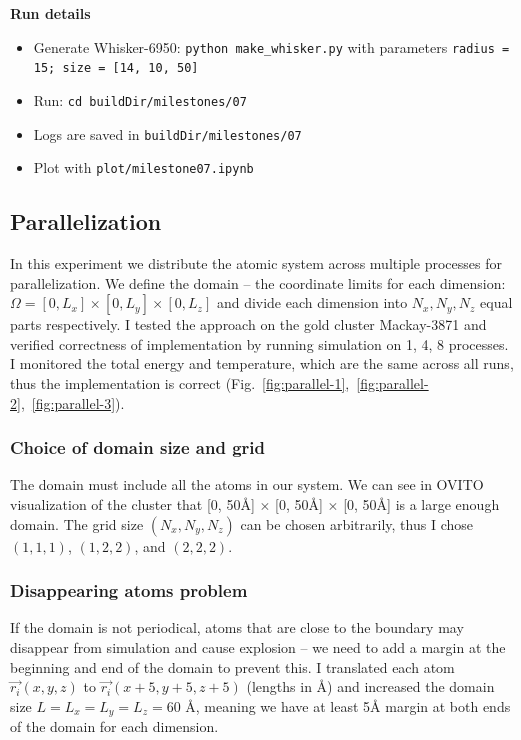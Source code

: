 \documentclass[12pt,a4paper]{article}
\newcommand{\mat}[1]{\vec{#1}}
\begin{document}
{\bf Run details}
\begin{itemize}
	\item Generate Whisker-6950: \verb|python make_whisker.py| with parameters \verb|radius = 15; size = [14, 10, 50]|
	\item Run: \verb|cd buildDir/milestones/07|
	\item Logs are saved in \verb|buildDir/milestones/07|
	\item Plot with \verb|plot/milestone07.ipynb|
	
\end{itemize}

\newpage

\subsection*{Parallelization}

In this experiment we distribute the atomic system across multiple processes for parallelization. We define the domain -- the coordinate limits for each dimension: $\Omega = [0, L_x] \times [0, L_y] \times [0, L_z]$ and divide each dimension into $N_x, N_y, N_z$ equal parts respectively. I tested the approach on the gold cluster Mackay-3871 and verified correctness of implementation by running simulation on 1, 4, 8 processes. I monitored the total energy and temperature, which are the same across all runs, thus the implementation is correct (Fig.~\ref{fig:parallel-1},~\ref{fig:parallel-2},~\ref{fig:parallel-3}).

\subsubsection*{Choice of domain size and grid}

The domain must include all the atoms in our system. We can see in OVITO visualization of the cluster that [0, 50Å] $\times$ [0, 50Å] $\times$ [0, 50Å] is a large enough domain. The grid size $(N_x, N_y, N_z)$ can be chosen arbitrarily, thus I chose $(1, 1, 1)$, $(1, 2, 2)$, and $(2, 2, 2)$.

\subsubsection*{Disappearing atoms problem}

If the domain is not periodical, atoms that are close to the boundary may disappear from simulation and cause explosion -- we need to add a margin at the beginning and end of the domain to prevent this. I translated each atom $\mat{r_i}(x, y, z)$ to  $\mat{r_i}(x + 5, y + 5, z + 5)$ (lengths in Å) and increased the domain size $L = L_x = L_y = L_z = 60$ Å, meaning we have at least 5Å margin at both ends of the domain for each dimension.
\end{document}
